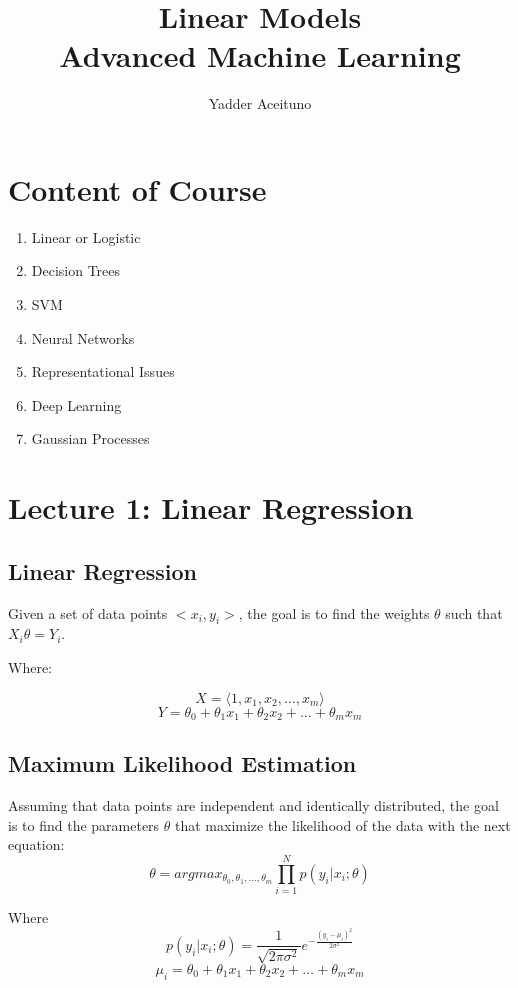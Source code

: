 \documentclass{article}
\title{Linear Models\\
\large Advanced Machine Learning}
\author{Yadder Aceituno}
\begin{document}
\maketitle


\section{Content of Course}

\begin{enumerate}
    \item Linear or Logistic
    \item Decision Trees
    \item SVM
    \item Neural Networks
    \item Representational Issues
    \item Deep Learning
    \item Gaussian Processes
\end{enumerate}

\section{Lecture 1: Linear Regression}

\subsection{Linear Regression}

Given a set of data points $<x_i, y_i>$, the goal is to find the weights 
$\theta$ such that $X_i \theta = Y_i$.

Where:

$$X = \langle 1, x_1, x_2, \ldots, x_m \rangle$$
$$Y =  \theta_0 + \theta_1 x_1 + \theta_2 x_2 + \ldots + \theta_m x_m$$

\subsection{Maximum Likelihood Estimation}

Assuming that data points are independent and identically distributed, 
the goal is to find the parameters $\theta$ that maximize the likelihood 
of the data with the next equation:
$$
\theta = argmax_{\theta_0, \theta_1, \ldots, \theta_m} \prod_{i=1}^{N} p(y_i | x_i; \theta)
$$


Where 
$$
p(y_i | x_i; \theta) = \frac{1}{\sqrt{2\pi \sigma^2}} e^{-\frac{(y_i - \mu_i)^2}{2\sigma^2}}
$$
$$
\mu_i = \theta_0 + \theta_1 x_1 + \theta_2 x_2 + \ldots + \theta_m x_m
$$
\end{document}
